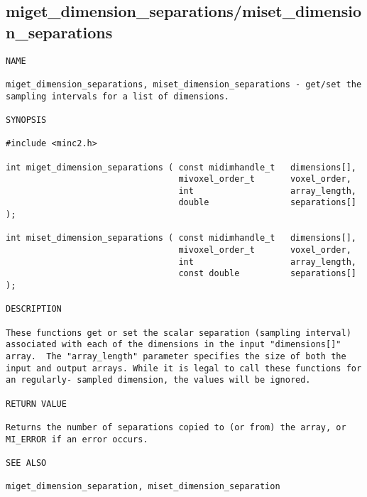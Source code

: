 \documentclass{article}
\begin{document}
\subsection{miget\_dimension\_separations/miset\_dimension\_separations}
\begin{verbatim}
NAME

miget_dimension_separations, miset_dimension_separations - get/set the
sampling intervals for a list of dimensions.

SYNOPSIS

#include <minc2.h>

int miget_dimension_separations ( const midimhandle_t   dimensions[],
                                  mivoxel_order_t       voxel_order,
                                  int                   array_length,
                                  double                separations[] );

int miset_dimension_separations ( const midimhandle_t   dimensions[],
                                  mivoxel_order_t       voxel_order,
                                  int                   array_length,
                                  const double          separations[] );

DESCRIPTION

These functions get or set the scalar separation (sampling interval)
associated with each of the dimensions in the input "dimensions[]"
array.  The "array_length" parameter specifies the size of both the
input and output arrays. While it is legal to call these functions for
an regularly- sampled dimension, the values will be ignored.

RETURN VALUE

Returns the number of separations copied to (or from) the array, or
MI_ERROR if an error occurs.

SEE ALSO

miget_dimension_separation, miset_dimension_separation
\end{verbatim}
\end{document}
